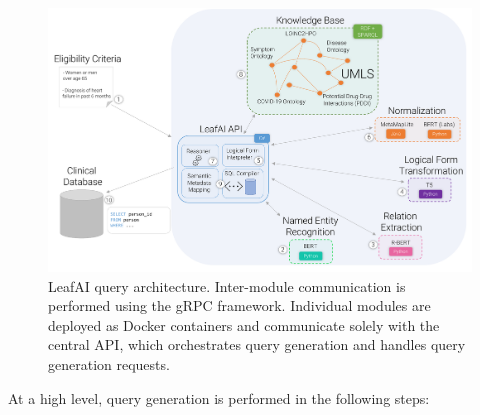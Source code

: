 \documentclass[../main.tex]{subfiles}
\begin{document}
\begin{figure}[h]
  \includegraphics[scale=0.57]{Figures/7_query_generation/leafai_architecture.pdf}  
\caption{LeafAI query architecture. Inter-module communication is performed using the gRPC framework. Individual modules are deployed as Docker \cite{docker} containers and communicate solely with the central API, which orchestrates query generation and handles query generation requests.}
\label{fig_leafai_architecture}
\end{figure}

At a high level, query generation is performed in the following steps:
\end{document}
